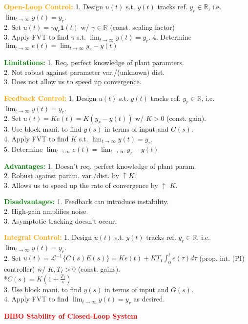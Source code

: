 \documentclass[5pt]{extarticle} %
\begin{document}
\begin{paracol}{3}
{    \textcolor{orange}{\textbf{Open-Loop Control:}} 1. Design $u(t)$ s.t. $y(t)$ tracks ref. $y_r \in \mathbb{R}$, i.e. $\lim_{t \rightarrow \infty} y(t) = y_r$. \\
    2. Set $u(t) = \gamma y_r \mathbf{1}(t)$ w/ $\gamma \in \mathbb{R}$ (const. scaling factor) \\
    3. Apply FVT to find $\gamma$ s.t. $\lim_{t \to \infty} y(t) = y_r$.
    4. Determine $\lim_{t \rightarrow \infty} e(t) = \lim_{t \rightarrow \infty} y_r - y(t)$

    \textcolor{green}{\textbf{Limitations:}} 1. Req. perfect knowledge of plant paramters. \\
    2. Not robust against parameter var./(unknown) dist. \\
    3. Does not allow us to speed up convergence. 

    \textcolor{orange}{\textbf{Feedback Control:}} 1. Design $u(t)$ s.t. $y(t)$ tracks ref. $y_r \in \mathbb{R}$, i.e. $\lim_{t \rightarrow \infty} y(t) = y_r$. \\
    2. Set $u(t) = K e(t) = K (y_r - y(t))$ w/ $K>0$ (const. gain). \\ 
    3. Use block mani. to find $y(s)$ in terms of input and $G(s)$. \\
    4. Apply FVT to find $K$ s.t. $\lim_{t \to \infty} y(t) = y_r$. \\
    5. Determine $\lim_{t \rightarrow \infty} e(t) = \lim_{t \rightarrow \infty} y_r - y(t)$

    \textcolor{green}{\textbf{Advantages:}} 1. Doesn't req. perfect knowledge of plant param. \\
    2. Robust against param. var./dist. by $\uparrow K$. \\
    3. Allows us to speed up the rate of convergence by $\uparrow$ $K$.

    \textcolor{green}{\textbf{Disadvantages:}} 1. Feedback can introduce instability. \\
    2. High-gain amplifies noise. \\
    3. Asymptotic tracking doesn't occur. 

    \textcolor{orange}{\textbf{Integral Control:}} 1. Design $u(t)$ s.t. $y(t)$ tracks ref. $y_r \in \mathbb{R}$, i.e. $\lim_{t \rightarrow \infty} y(t) = y_r$. \\
    2. Set $u(t) = \mathcal{L}^{-1} \{C(s)E(s)\} = K e(t) + K T_I \int_0^t e(\tau) d\tau$ (prop. int. (PI) controller) w/ $K, T_I > 0$ (const. gains). \\
    *$C(s) = K \left(1 + \frac{T_I}{s}\right)$ \\
    3. Use block mani. to find $y(s)$ in terms of input and $G(s)$. \\
    4. Apply FVT to find $\lim_{t \to \infty} y(t) = y_r$ as desired. 

    \textcolor{red}{\textbf{BIBO Stability of Closed-Loop System}} 



        }
\end{paracol}
\end{document}
